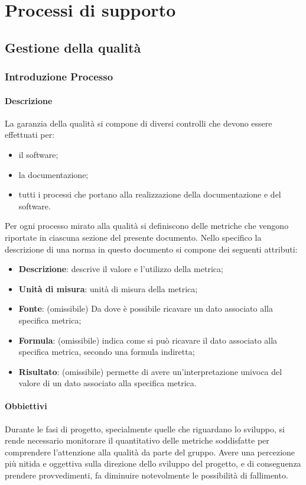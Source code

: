 \section{Processi di supporto}
    \subsection{Gestione della qualità}
        \subsubsection{Introduzione Processo}
            \paragraph{Descrizione}
                La garanzia della qualità si compone di diversi controlli che devono essere effettuati per:
                \begin{itemize}
                    \item il software;
                    \item la documentazione;
                    \item tutti i processi che portano alla realizzazione della documentazione e del software.
                \end{itemize}
                Per ogni processo mirato alla qualità si definiscono delle metriche che vengono riportate in ciascuna sezione del presente documento. Nello specifico la descrizione di una norma in questo documento si compone dei seguenti attributi:
                \begin{itemize}
                    \item\textbf{Descrizione}: descrive il valore e l’utilizzo della metrica;
                    \item\textbf{Unità di misura}: unità di misura della metrica;
                    \item\textbf{Fonte}: (omissibile) Da dove è possibile ricavare un dato associato alla specifica metrica;    
                    \item\textbf{Formula}: (omissibile) indica come si può ricavare il dato associato alla specifica metrica, secondo una formula indiretta;
                    \item\textbf{Risultato}: (omissibile) permette di avere un’interpretazione univoca del valore di un dato associato alla specifica metrica.
                \end{itemize}
            \paragraph{Obbiettivi}
                Durante le fasi di progetto, specialmente quelle che riguardano lo sviluppo, si rende necessario monitorare il quantitativo delle metriche soddisfatte per comprendere l'attenzione alla qualità da parte del gruppo. Avere una percezione più nitida e oggettiva sulla direzione dello sviluppo del progetto, e di conseguenza prendere provvedimenti, fa diminuire notevolmente le possibilità di fallimento.
